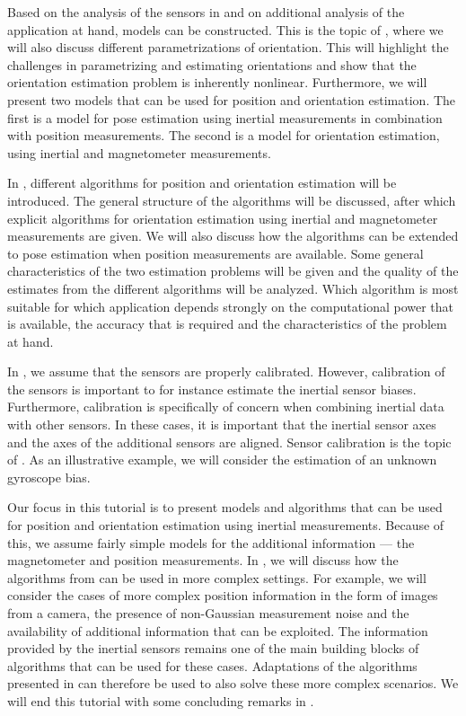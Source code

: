 Based on the analysis of the sensors in  and on additional analysis of the application at hand, models can be constructed. This is the topic of , where we will also discuss different parametrizations of orientation. This will highlight the challenges in parametrizing and estimating orientations and show that the orientation estimation problem is inherently nonlinear. Furthermore, we will present two models that can be used for position and orientation estimation. The first is a model for pose estimation using inertial measurements in combination with position measurements. The second is a model for orientation estimation, using inertial and magnetometer measurements. 

In , different algorithms for position and orientation estimation will be introduced. The general structure of the algorithms will be discussed, after which explicit algorithms for orientation estimation using inertial and magnetometer measurements are given. We will also discuss how the algorithms can be extended to pose estimation when position measurements are available. Some general characteristics of the two estimation problems will be given and the quality of the estimates from the different algorithms will be analyzed. Which algorithm is most suitable for which application depends strongly on the computational power that is available, the accuracy that is required and the characteristics of the problem at hand. 

In , we assume that the sensors are properly calibrated. However, calibration of the sensors is important to for instance estimate the inertial sensor biases. Furthermore, calibration is specifically of concern when combining inertial data with other sensors. In these cases, it is important that the inertial sensor axes and the axes of the additional sensors are aligned. Sensor calibration is the topic of . As an illustrative example, we will consider the estimation of an unknown gyroscope bias. 

Our focus in this tutorial is to present models and algorithms that can be used for position and orientation estimation using inertial measurements. Because of this, we assume fairly simple models for the additional information --- the magnetometer and position measurements. In , we will discuss how the algorithms from  can be used in more complex settings. For example, we will consider the cases of more complex position information in the form of images from a camera, the presence of non-Gaussian measurement noise and the availability of additional information that can be exploited. The information provided by the inertial sensors remains one of the main building blocks of algorithms that can be used for these cases. Adaptations of the algorithms presented in  can therefore be used to also solve these more complex scenarios. We will end this tutorial with some concluding remarks in .